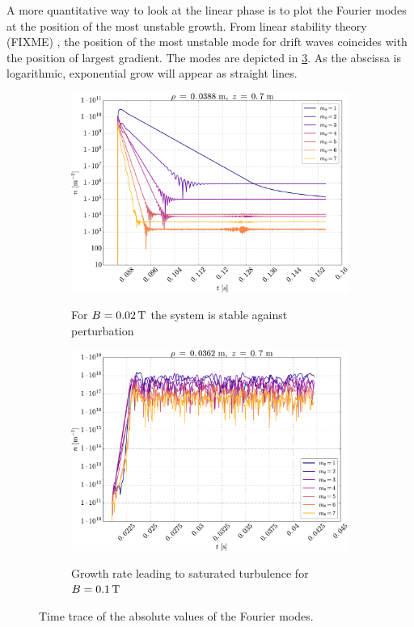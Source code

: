 A more quantitative way to look at the linear phase is to plot the Fourier modes at the position of the most unstable growth.
From linear stability theory (FIXME)
, the position of the most unstable mode for drift waves coincides with the position of largest gradient.
The modes are depicted in \cref{fig:fourierDens}.
As the abscissa is logarithmic, exponential grow will appear as straight lines.
%
\begin{figure}[h!]
    \centering
    \begin{subfigure}[h]{0.45\textwidth}
        \centering
        \includegraphics[width=1.0\textwidth]{fig/results/fourierModes/stable}
        \label{fig:fourierStable}
        \caption{For $B=0.02\, \text{T}$ the system is stable against perturbation}
    \end{subfigure}%
    \hfill
    \begin{subfigure}[h]{0.45\textwidth}
        \centering
        \includegraphics[width=1.0\textwidth]{fig/results/fourierModes/unstable}
        \label{fig:fourierUnstable}
        \caption{Growth rate leading to saturated turbulence for $B=0.1\, \text{T}$}
    \end{subfigure}
    \caption{Time trace of the absolute values of the Fourier modes.}
    \label{fig:fourierDens}
\end{figure}
